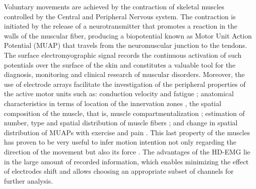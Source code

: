     Voluntary movements are achieved by the contraction of skeletal muscles controlled by the Central and Peripheral Nervous system. The contraction is initiated by the release of a neurotransmitter that promotes a reaction in the walls of the muscular fiber, producing a biopotential known as Motor Unit Action Potential (MUAP) that travels from the neuromuscular junction to the tendons. The surface electromyographic signal records the continuous activation of such potentials over the surface of the skin and constitutes a valuable tool for the diagnosis, monitoring and clinical research of muscular disorders. Moreover, the use of electrode arrays facilitate the investigation of the peripheral properties of the active motor units such as: conduction velocity and fatigue \citep{Soares2015}; anatomical characteristics in terms of location of the innervation zones \citep{Beck2012}, the spatial composition of the muscle, that is, muscle compartmentalization \citep{Vieira2010}; estimation of number, type and spatial distribution of muscle fibers \citep{Marateb2016}; and change in spatial distribution of MUAPs with exercise and pain \citep{Madeleine2006}. This last property of the muscles has proven to be very useful to infer motion intention not only regarding the direction of the movement but also its force \citep{Rojas-Martinez2013}. The advantages of the HD-EMG lie in the large amount of recorded information, which enables minimizing the effect of electrodes shift and allows choosing an appropriate subset of channels for further analysis.  
    
